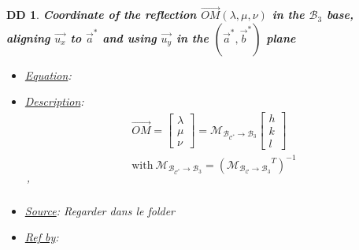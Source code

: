 \documentclass[12pt]{article}
\newtheorem{DD}{DD}
\begin{document}
\begin{DD}
\label{DD_2}
\noindent\colorbox{shadecolorDD}{\normalfont \textbf{Coordinate of the reflection $ \overrightarrow{OM}(\lambda,\mu,\nu)$ in the $\mathcal{B}_3$ base, \\ aligning $\vec{u_x}$ to $\vec{a}^{*}$ and using $\vec{u_y}$ in the $(\vec{a}^{*}, \vec{b}^{*})$ plane}}
\normalfont
\begin{itemize}
\item \underline{Equation}: 
\item \underline{Description}: 
\begin{equation}
\begin{gathered}
 \overrightarrow{OM} = 
\begin{bmatrix}
\lambda \\
\mu \\
\nu 
\end{bmatrix} =  \mathcal{M_{\mathcal{B}_{C^{*}}\rightarrow \mathcal{B}_3}} 
\begin{bmatrix}
h \\
k \\
l 
\end{bmatrix} \\ 
\text{with} \ \mathcal{M_{\mathcal{B}_{C^{*}}\rightarrow \mathcal{B}_3}}  = 
(\mathcal{M_{\mathcal{B}_{C}\rightarrow \mathcal{B}_3}}^{T})^{-1} 
\end{gathered}
\label{eq:change_base_reciprocal_base_unif}
\end{equation} '

\item \underline{Source}: Regarder dans le folder
\item \underline{Ref by}: 
\end{itemize}
\end{DD}
\end{document}
